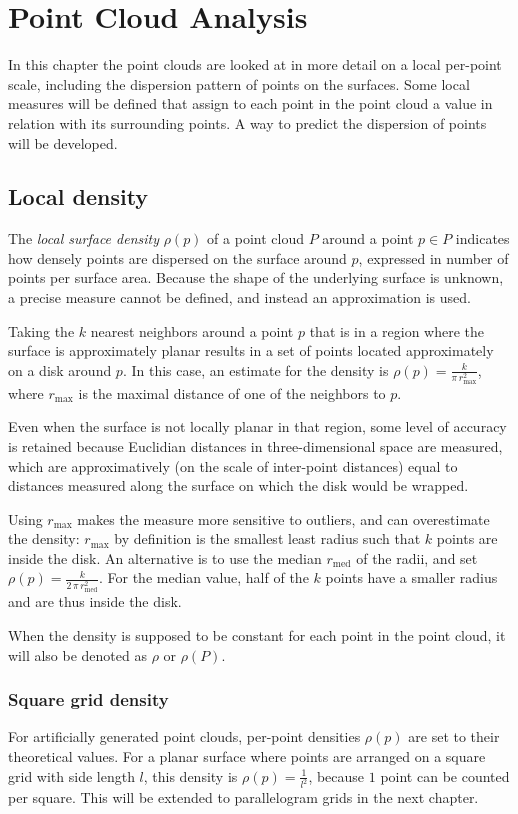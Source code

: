 \chapter{Point Cloud Analysis} \label{ch:analysis_pc}
In this chapter the point clouds are looked at in more detail on a local per-point scale, including the dispersion pattern of points on the surfaces. Some local measures will be defined that assign to each point in the point cloud a value in relation with its surrounding points. A way to predict the dispersion of points will be developed.

\section{Local density}
The \emph{local surface density} $\rho(p)$ of a point cloud $P$ around a point $p \in P$ indicates how densely points are dispersed on the surface around $p$, expressed in number of points per surface area. Because the shape of the underlying surface is unknown, a precise measure cannot be defined, and instead an approximation is used.

Taking the $k$ nearest neighbors around a point $p$ that is in a region where the surface is approximately planar results in a set of points located approximately on a disk around $p$. In this case, an estimate for the density is $\rho(p) = \frac{k}{\pi \, r_{\text{max}}^2}$, where $r_{\text{max}}$ is the maximal distance of one of the neighbors to $p$.

Even when the surface is not locally planar in that region, some level of accuracy is retained because Euclidian distances in three-dimensional space are measured, which are approximatively (on the scale of inter-point distances) equal to distances measured along the surface on which the disk would be wrapped.

Using $r_{\text{max}}$ makes the measure more sensitive to outliers, and can overestimate the density: $r_{\text{max}}$ by definition is the smallest least radius such that $k$ points are inside the disk. An alternative is to use the median $r_{\text{med}}$ of the radii, and set $\rho(p) = \frac{k}{2 \, \pi \, r_{\text{med}}^2}$. For the median value, half of the $k$ points have a smaller radius and are thus inside the disk.

When the density is supposed to be constant for each point in the point cloud, it will also be denoted as $\rho$ or $\rho(P)$.

\subsection{Square grid density}
For artificially generated point clouds, per-point densities $\rho(p)$ are set to their theoretical values. For a planar surface where points are arranged on a square grid with side length $l$, this density is $\rho(p) = \frac{1}{l^2}$, because $1$ point can be counted per square. This will be extended to parallelogram grids in the next chapter.


